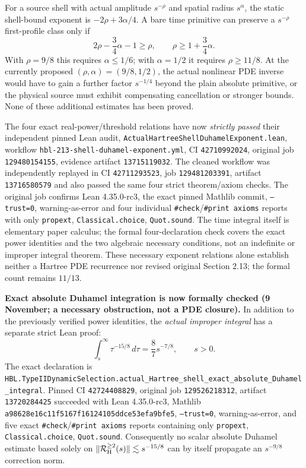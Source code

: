 \documentclass[11pt]{amsart}
\begin{document}
For a source shell with actual amplitude $s^{-\rho}$ and spatial
radius $s^\alpha$, the static shell-bound exponent is
$-2\rho+3\alpha/4$. A bare time primitive can preserve a
$s^{-\rho}$ first-profile class only if
\[
 2\rho-\frac34\alpha-1\ge\rho,
 \qquad\boxed{\rho\ge 1+\frac34\alpha}.
\]
With $\rho=9/8$ this requires $\alpha\le1/6$; with
$\alpha=1/2$ it requires $\rho\ge11/8$. At the currently
proposed $(\rho,\alpha)=(9/8,1/2)$, the actual nonlinear PDE
inverse would have to gain a further factor $s^{-1/4}$ beyond
the plain absolute primitive, or the physical source must exhibit
compensating cancellation or stronger bounds. None of these
additional estimates has been proved.

The four exact real-power/threshold relations have now
\emph{strictly passed} their independent pinned Lean audit,
\texttt{ActualHartreeShellDuhamelExponent.lean}, workflow
\texttt{hbl-213-shell-duhamel-exponent.yml},
CI \texttt{42710992024}, original job \texttt{129480154155},
evidence artifact \texttt{13715119032}. The cleaned workflow
was independently replayed in CI \texttt{42711293523},
job \texttt{129481203391}, artifact \texttt{13716580579}
and also passed the same four strict theorem/axiom checks. The original job
confirms Lean 4.35.0-rc3, the exact pinned Mathlib commit,
\texttt{--trust=0}, warning-as-error and four individual
\texttt{\#check}/\texttt{\#print axioms} reports with only
\texttt{propext}, \texttt{Classical.choice}, \texttt{Quot.sound}.
The time integral itself is elementary paper calculus;
the formal four-declaration check covers the exact power identities
and the two algebraic necessary conditions, not an indefinite or
improper integral theorem.
These necessary exponent relations alone establish neither a
Hartree PDE recurrence nor revised original Section 2.13;
the formal count remains $11/13$.


\medskip
\noindent\textbf{Exact absolute Duhamel integration is now formally checked
(9 November; a necessary obstruction, not a PDE closure).}
In addition to the previously verified power identities, the
\emph{actual improper integral} has a separate strict Lean proof:
\[
 \boxed{\quad
 \int_s^\infty \tau^{-15/8}\,d\tau
  =\frac87s^{-7/8},\qquad s>0.\quad}
\]
The exact declaration is
\texttt{HBL.TypeIIDynamicSelection.actual\_Hartree\_shell\_exact\_absolute\_Duhamel\_integral}.
Pinned CI \texttt{42724408829}, original job \texttt{129526218312},
artifact \texttt{13720284425} succeeded with Lean 4.35.0-rc3,
Mathlib \texttt{a98628e16c11f5167f16124105ddce53efa9bfe5},
\texttt{--trust=0}, warning-as-error, and five exact
\texttt{\#check}/\texttt{\#print axioms} reports containing only
\texttt{propext}, \texttt{Classical.choice}, \texttt{Quot.sound}.
Consequently no scalar absolute Duhamel estimate based solely on
$\|\mathcal R_{\rm H}^{\ge2}(s)\|\lesssim s^{-15/8}$ can
by itself propagate an $s^{-9/8}$ correction norm.
\end{document}
